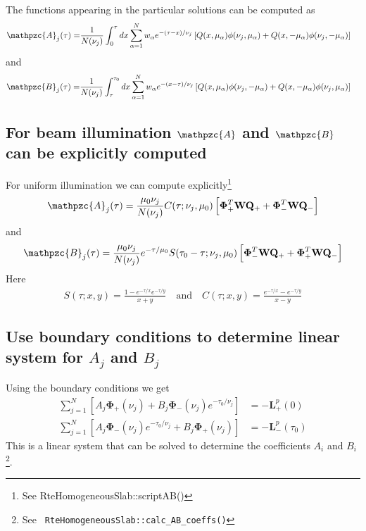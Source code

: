\documentclass[11pt]{article}
\newcommand{\mvec}[1]{\mathbf{#1}}
\newcommand{\gvec}[1]{\boldsymbol{#1}}
\newcommand{\script}[1]{\mathpzc{#1}}
\begin{document}
The functions appearing in the particular solutions can be computed as
\begin{align}
  \script{A}_j(\tau) = &\frac{1}{N(\nu_j)}
  \int_0^\tau dx
  \sum_{\alpha=1}^N w_\alpha e^{-(\tau-x)/\nu_j}
  \left[
    Q(x,\mu_\alpha)\phi(\nu_j,\mu_\alpha) +
    Q(x,-\mu_\alpha)\phi(\nu_j,-\mu_\alpha)
  \right]
\end{align}
and
\begin{align}
  \script{B}_j(\tau) = &\frac{1}{N(\nu_j)}
  \int_\tau^{\tau_0} dx
  \sum_{\alpha=1}^N w_\alpha e^{-(x-\tau)/\nu_j}
  \left[
    Q(x,\mu_\alpha)\phi(\nu_j,-\mu_\alpha) +
    Q(x,-\mu_\alpha)\phi(\nu_j,\mu_\alpha)
  \right]
\end{align}


\subsection{For beam illumination $\script{A}$ and $\script{B}$ can
  be explicitly computed}
For uniform illumination we can compute explicitly\footnote{See
  RteHomogeneousSlab::scriptAB()}
\begin{align}
  \script{A}_j(\tau) = \frac{\mu_0 \nu_j}{N(\nu_j)}
  C(\tau ; \nu_j, \mu_0)
  \left[
    \gvec{\Phi}_+^T \mvec{W} \mvec{Q}_+ +
    \gvec{\Phi}_-^T \mvec{W} \mvec{Q}_-
  \right]
\end{align}
and
\begin{align}
  \script{B}_j(\tau) = \frac{\mu_0 \nu_j}{N(\nu_j)}
  e^{-\tau/\mu_0}S(\tau_0-\tau ; \nu_j, \mu_0)
  \left[
    \gvec{\Phi}_-^T \mvec{W} \mvec{Q}_+ +
    \gvec{\Phi}_+^T \mvec{W} \mvec{Q}_-
  \right]
\end{align}
Here
\begin{align}
  S(\tau;x,y) = \frac{1-e^{-\tau/x}e^{-\tau/y}}{x+y} \quad\textrm{and}\quad
  C(\tau;x,y) = \frac{e^{-\tau/x}-e^{-\tau/y}}{x-y}
\end{align}




\subsection{Use boundary conditions to determine linear system for
  $A_j$ and $B_j$}
Using the boundary conditions we get
\begin{align}
  \sum_{j=1}^N
  \left[
    A_j \gvec{\Phi}_+(\nu_j) +
    B_j \gvec{\Phi}_-(\nu_j) e^{-\tau_0/\nu_j}
  \right]
  &= -\mvec{L}_+^p(0) \\
  \sum_{j=1}^N
  \left[
    A_j \gvec{\Phi}_-(\nu_j) e^{-\tau_0/\nu_j} +
    B_j \gvec{\Phi}_+(\nu_j)
  \right]
  &= -\mvec{L}_-^p(\tau_0)
\end{align}
This is a linear system that can be solved to determine the
coefficients $A_i$ and $B_i$\footnote{See {\tt
    RteHomogeneousSlab::calc\_AB\_coeffs()}}.
\end{document}
